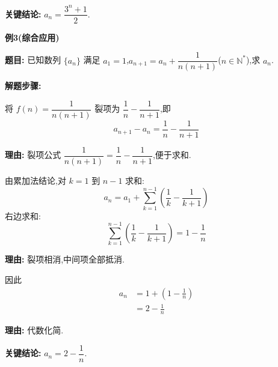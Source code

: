 \begin{examplebox}
	\textbf{\textcolor{CExample}{关键结论:}}
	\textbf{$a_n=\dfrac{3^n+1}{2}$}.

	\medskip
	\textbf{\textcolor{CExample}{例3(综合应用)}}

	\textbf{\textcolor{CExample}{题目:}}
	已知数列 $\{a_n\}$ 满足 $a_1=1$,$a_{n+1}=a_n+\dfrac{1}{n(n+1)}$($n\in\mathbb{N}^*$),求 $a_n$.

	\textbf{\textcolor{CExample}{解题步骤:}}
	\begin{description}[style=nextline, leftmargin=2.8em, labelsep=0.5em, itemsep=0.45em]
		\item[\textbf{第一步(裂项变形):}] 将 $f(n)=\dfrac{1}{n(n+1)}$ 裂项为 $\dfrac{1}{n}-\dfrac{1}{n+1}$,即
			\[
				a_{n+1}-a_n = \frac{1}{n} - \frac{1}{n+1}
			\]
			\par\textbf{理由:} 裂项公式 $\dfrac{1}{n(n+1)}=\dfrac{1}{n}-\dfrac{1}{n+1}$,便于求和.
		\item[\textbf{第二步(累加求和):}] 由累加法结论,对 $k=1$ 到 $n-1$ 求和:
			\[
				a_n = a_1 + \sum_{k=1}^{n-1} \left(\frac{1}{k}-\frac{1}{k+1}\right)
			\]
			右边求和:
			\[
				\sum_{k=1}^{n-1} \left(\frac{1}{k}-\frac{1}{k+1}\right) = 1-\frac{1}{n}
			\]
			\par\textbf{理由:} 裂项相消,中间项全部抵消.
		\item[\textbf{第三步(得到通项):}] 因此
			\[
				\begin{aligned}
					a_n &= 1 + \left(1-\frac{1}{n}\right) \\
					&= 2-\frac{1}{n}
			\end{aligned}
			\]
			\par\textbf{理由:} 代数化简.
	\end{description}

	\textbf{\textcolor{CExample}{关键结论:}}
	\textbf{$a_n=2-\dfrac{1}{n}$}.
\end{examplebox}
